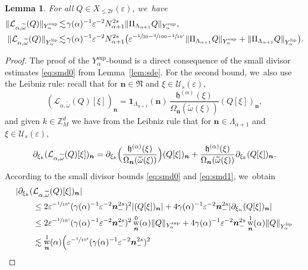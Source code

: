 \documentclass[10pt,a4paper]{amsart}
\DeclareMathOperator{\rw}{w}
\theoremstyle{plain}
\newtheorem{lemma}[theorem]{Lemma}
\theoremstyle{definition}
\newcommand{\nb}{{\boldsymbol n}}
\newcommand{\Nb}{{\boldsymbol{\mathfrak{N}}}}
\newcommand{\Z}{\mathbb{Z}}
\newcommand{\1}{\mathbf{1}}
\newcommand{\Ysup}[1]{Y_{#1}^{\mathrm{sup}}}
\newcommand{\Ylip}[1]{Y_{#1}^{\mathrm{lip}}}
\let\epsilon\varepsilon
\begin{document}
\begin{lemma}
\label{lem:23}
For all $Q\in X_{\leq2\overline{r}}(\epsilon)$, we~have
\begin{align*}
\|\mathcal{L}_{\alpha,\widetilde{\omega}}(Q)\|_{\Ysup{\alpha}}
&\!\lesssim\! \gamma(\alpha)^{-1}\epsilon^{-2}N_{\alpha+1}^{2s}\|\Pi_{\Lambda_{\alpha+1}}Q\|_{\Ysup{\alpha}},\\
\|\mathcal{L}_{\alpha,\widetilde{\omega}}(Q)\|_{\Ylip{\alpha}}
&\!\lesssim\!
\gamma(\alpha)^{-1}
\epsilon^{-2}N_{\alpha+1}^{2s}
\bigl(
\epsilon^{-\sfrac{1}{30}-\sfrac{3}{100}-\sfrac{1}{10^{4}}}\|\Pi_{\Lambda_{\alpha+1}}Q\|_{\Ysup{\alpha}}
+
\|\Pi_{\Lambda_{\alpha+1}}Q\|_{\Ylip{\alpha}}
\bigr).
\end{align*}
\end{lemma}

\begin{proof}
The proof of the $\Ysup{\alpha}$-bound is a direct consequence of the small divisor estimates \eqref{eq:smd0} from Lemma~\ref{lem:sde}. For the second bound, we~also use the Leibniz rule: recall that for $\nb\in\Nb$ and $\xi\in\mathcal{U}_{s}(\epsilon)$,
\[
(
\mathcal{L}_{\alpha,\widetilde{\omega}}(Q)[\xi]
)_{\nb}
=
\mathbf{1}_{\Lambda_{\alpha+1}}(\nb)\,\frac{\mathfrak{h}^{(\alpha)}(\xi)}{\Omega_{\nb}(\widetilde{\omega}(\xi))}(Q[\xi])_{\nb},
\]
and given $k\in\Z_{M}^{d}$ we have from the Leibniz rule that for $\nb\in\Lambda_{\alpha+1}$ and $\xi\in\mathcal{U}_{s}(\epsilon)$,
\[
\partial_{\xi_{k}}(
\mathcal{L}_{\alpha,\widetilde{\omega}}(Q)[\xi]
)_{\nb}
=
\partial_{\xi_{k}}\Bigl(\frac{\mathfrak{h}^{(\alpha)}(\xi)}{\Omega_{\nb}(\widetilde{\omega}(\xi))}\Bigr)(Q[\xi])_{\nb}
+
\frac{\mathfrak{h}^{(\alpha)}(\xi)}{\Omega_{\nb}(\widetilde{\omega}(\xi))}
\partial_{\xi_{k}}(Q[\xi])_{\nb}.
\]
According to the small divisor bounds \eqref{eq:smd0} and \eqref{eq:smd1}, we~obtain
\begin{align*}
|\partial_{\xi_{k}}(&
\mathcal{L}_{\alpha,\widetilde{\omega}}(Q)[\xi]
)_{\nb}
| \\
&\leq
2\epsilon^{-\sfrac{1}{10^{4}}}(\gamma(\alpha)^{-1}\epsilon^{-2}\nb_{-}^{2s})^{2}
|(Q[\xi])_{\nb}|
+
4\gamma(\alpha)^{-1}\epsilon^{-2}\nb_{-}^{2s}
|\partial_{\xi_{n}}(Q[\xi])_{\nb}| \\
&
\leq
2\epsilon^{-\sfrac{1}{10^{4}}}(\gamma(\alpha)^{-1}\epsilon^{-2}\nb_{-}^{2s})^{2}
\rw_{\nb}^{0}(\alpha)\|Q\|_{\Ysup{\alpha}}
+
4\gamma(\alpha)^{-1}\epsilon^{-2}\nb_{-}^{2s}
\rw_{\nb}^{1}(\alpha)\|Q\|_{\Ylip{\alpha}}\\
&\lesssim
\rw_{\nb}^{1}(\alpha)
\Big(
\epsilon^{-\sfrac{1}{10^{4}}}(\gamma(\alpha)^{-1}\epsilon^{-2}\nb_{-}^{2s})^{2}

\end{align*}
\end{proof}
\end{document}
